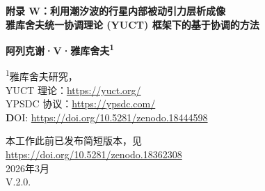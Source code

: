 \documentclass[12pt,a4paper]{article}
\theoremstyle{remark}
\newcommand{\Keff}{K_{\mathrm{eff}}}
\newcommand{\kappac}{\kappa_c}
\newcommand{\eps}{\varepsilon}
\begin{document}
	
	\begin{titlepage}
		\begin{center}
			\vspace*{1cm}
			
			\Huge\textbf{附录 W：利用潮汐波的行星内部被动引力层析成像} \\
			\vspace{0.5cm}
			\Large\textbf{雅库舍夫统一协调理论 (YUCT) 框架下的基于协调的方法}
			
			\vspace{1.5cm}
			
			\Large\textbf{阿列克谢·V·雅库舍夫\textsuperscript{1}}
			
			\vspace{0.3cm}
			\large
			\textsuperscript{1}雅库舍夫研究， \\
			YUCT 理论：\url{https://yuct.org/}\\
			YPSDC 协议：\url{https://ypsdc.com/}\\
			
			\vspace{2cm}
			\textbf DOI: \url{https://doi.org/10.5281/zenodo.18444598}\\
			
			\vspace{1cm}
			
			\vspace{0cm}
			\large 
			本工作此前已发布简短版本，见\\ \url{https://doi.org/10.5281/zenodo.18362308}\\
			\vspace{1cm}
			2026年3月 \\ \large V.2.0.
			
			\vspace{2cm}
			
			\begin{minipage}{0.9\textwidth}
				\begin{abstract}
					\noindent
					本附录介绍了一种基于分析日月潮汐引力作用下地壳共振响应的被动地球物理勘探新方法。在雅库舍夫统一协调理论 (YUCT) 框架下，我们证明潮汐形变谱包含关于地下协调效率 $\Keff$ 分布的信息，而 $\Keff$ 与岩石类型、流体含量（油、气、水）及矿体直接相关。我们建立了将地表重力和地震测量与 $\Keff$ 的深度分布联系起来的数学模型，利用了通用误差缩放定律 $\eps = \kappac \alpha \Keff^{-\beta}$（$\beta=0.67$, $\kappac=0.33$）以及 YUCT 中第 0 扇区（引力）和第 34 扇区（行星科学）中引力场与弹性变形之间的耦合方程。我们表明潮汐波提供了一种廉价、环保且全球适用的深部探测方法，其穿透深度是主动震源无法达到的。我们综述了预见到该方法要点的独立研究，包括对潮汐共振的直接观测以及利用引力潮进行油气勘探的建议。基于与元素周期表类似的基于协调的矿物和流体分类系统，提出了通过特征共振频率和品质因数识别碳氢化合物的方法。评估了经济可行性：将干井钻探风险降低 20–30\% 即可多次收回部署成本。我们进一步将该方法扩展到工程结构（摩天大楼、桥梁、大坝）的结构健康监测、地震预测和海啸预报，证明相同的物理原理能够催生一类革命性的被动监测技术，有潜力拯救数百万人的生命和数万亿美元。这些结果为利用天然引力场实现全新的勘探与监测技术开辟了道路。
				\end{abstract}
			\end{minipage}
			

\end{center}
\end{titlepage}
\end{document}
